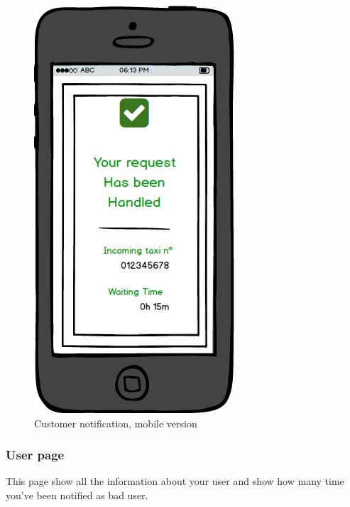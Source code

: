 \documentclass{report}
\begin{document}
				\begin{figure}[H]
					\centering
					\includegraphics[scale=0.4]{IMG/UserInterfaces/customerNotification_m.png}
					\caption{Customer notification, mobile version}\label{visina8}
				\end{figure}
			
			\subsubsection{User page}
			This page show all the information about your user and show how many time you've been notified as bad user.
			
\end{document}
